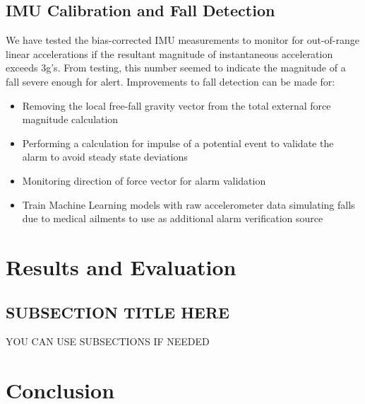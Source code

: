 \documentclass[conference]{IEEEtran}
\begin{document}
\subsection{IMU Calibration and Fall Detection}
We have tested the bias-corrected IMU measurements to monitor for out-of-range linear accelerations if the resultant magnitude of instantaneous acceleration exceeds 3g's. From testing, this number seemed to indicate the magnitude of a fall severe enough for alert. 
Improvements to fall detection can be made for: 
\begin{itemize}
    \item Removing the local free-fall gravity vector from the total external force magnitude calculation
    \item Performing a calculation for impulse of a potential event to validate the alarm to avoid steady state deviations
    \item Monitoring direction of force vector for alarm validation
    \item Train Machine Learning models with raw accelerometer data simulating falls due to medical ailments to use as additional alarm verification source
\end{itemize}

\section{Results and Evaluation}\label{results}
\subsection{SUBSECTION TITLE HERE}
YOU CAN USE SUBSECTIONS IF NEEDED

\section{Conclusion}
   




\end{document}
